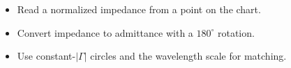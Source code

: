 \begin{objectives}
\begin{itemize}[leftmargin=1.4em,itemsep=2pt]
\item Read a normalized impedance from a point on the chart.
\item Convert impedance to admittance with a $180^{\circ}$ rotation.
\item Use constant-$|\Gamma|$ circles and the wavelength scale for matching.
\end{itemize}
\end{objectives}
